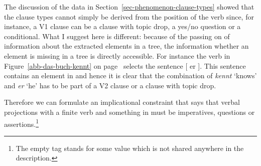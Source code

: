 The discussion of the data in Section~\ref{sec-phenomenon-clause-types} showed that the clause types cannot simply be derived
from the position of the verb since, for instance, a V1 clause can be a clause with topic drop, a
yes/no question or a conditional. What I suggest here is different: because of the passing on of
information about the extracted elements in a tree, the information whether an element is missing in
a tree is directly accessible. For instance the verb in Figure~\ref{abb-das-buch-kennt} on
page~\pageref{abb-das-buch-kennt} selects the sentence [ \trace{} er \trace{} ]. This sentence
contains an element in \slasch and hence it is clear that the combination of \emph{kennt} `knows'
and \emph{er} `he' has to be part of a V2 clause or a clause with topic drop.

Therefore we can formulate an implicational constraint that says that verbal projections with a
finite verb and something in \slasch must be imperatives, questions or assertions.\footnote{
  The empty tag \etag\is{\etag} stands for some value which is not shared anywhere in the description.
}

